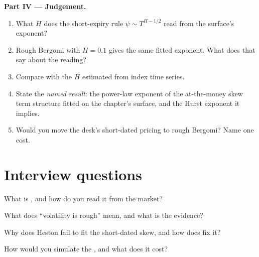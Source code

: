 \begin{problem}
\medskip\noindent\textbf{Part IV --- Judgement.}
\begin{enumerate}[resume]
\item What $H$ does the short-expiry rule $\psi\sim T^{H-1/2}$ read from the surface's exponent?
\item Rough Bergomi with $H=0.1$ gives the same fitted exponent. What does that say about the reading?
\item Compare with the $H$ estimated from index time series.
\item State the \emph{named result}: the power-law exponent of the at-the-money skew term structure fitted on the
chapter's surface, and the Hurst exponent it implies.
\item Would you move the desk's short-dated pricing to rough Bergomi? Name one cost.
\end{enumerate}
\end{problem}

\section{Interview questions}

\begin{interviewq}\label{iq:dv:rough-volatility-and-forward-variance-models:1}
What is , and how do you read it from the market?
\end{interviewq}

\begin{interviewq}\label{iq:dv:rough-volatility-and-forward-variance-models:2}
What does ``volatility is rough'' mean, and what is the evidence?
\end{interviewq}

\begin{interviewq}\label{iq:dv:rough-volatility-and-forward-variance-models:3}
Why does Heston fail to fit the short-dated skew, and how does  fix it?
\end{interviewq}

\begin{interviewq}\label{iq:dv:rough-volatility-and-forward-variance-models:4}
How would you simulate the , and what does it cost?
\end{interviewq}

